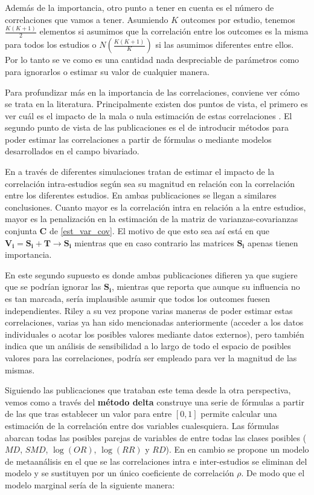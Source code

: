 \documentclass[a4paper,openright,12pt]{report}
\begin{document}
Además de la importancia, otro punto a tener en cuenta es el número de correlaciones que vamos a tener. Asumiendo $K$ outcomes por estudio, tenemos $\frac{K(K+1)}{2}$ elementos si asumimos que la correlación entre los outcomes es la misma para todos los estudios o $N(\frac{K(K+1)}{K})$ si las asumimos diferentes entre ellos. Por lo tanto se ve como es una cantidad nada despreciable de parámetros como para ignorarlos o estimar su valor de cualquier manera.

Para profundizar más en la importancia de las correlaciones, conviene ver cómo se trata en la literatura. Principalmente existen dos puntos de vista, el primero es ver cuál es el impacto de la mala o nula estimación de estas correlaciones \cite{Ishak2008}\cite{Riley2009}. El segundo punto de vista de las publicaciones es el de introducir métodos para poder estimar las correlaciones a partir de fórmulas \cite{Wei2013} o mediante modelos \cite{Riley2007_2}\cite{Riley2008} desarrollados en el campo bivariado.

En \cite{Ishak2008}\cite{Riley2009} a través de diferentes simulaciones tratan de estimar el impacto de la correlación intra-estudios según sea su magnitud en relación con la correlación entre los diferentes estudios. En ambas publicaciones se llegan a similares conclusiones. Cuanto mayor es la correlación intra en relación a la entre estudios, mayor es la penalización en la estimación de la matriz de varianzas-covarianzas conjunta $\mathbf{C}$ de \ref{est_var_cov}. El motivo de que esto sea así está en que $\mathbf{V_{i}} = \mathbf{S_{i}}+\mathbf{T} \longrightarrow \mathbf{S_{i}}$ mientras que en caso contrario las matrices $\mathbf{S_{i}}$ apenas tienen importancia.

En este segundo supuesto es donde ambas publicaciones difieren ya que \cite{Ishak2008} sugiere que se podrían ignorar las $\mathbf{S_{i}}$, mientras que \cite{Riley2009} reporta que aunque su influencia no es tan marcada, sería implausible asumir que todos los outcomes fuesen independientes. Riley a su vez propone varias maneras de poder estimar estas correlaciones, varias ya han sido mencionadas anteriormente (acceder a los datos individuales o acotar los posibles valores mediante datos externos), pero también indica que un análisis de sensibilidad a lo largo de todo el espacio de posibles valores para las correlaciones, podría ser empleado para ver la magnitud de las mismas.  

Siguiendo las publicaciones que trataban este tema desde la otra perspectiva, vemos como \cite{Wei2013} a través del \textbf{método delta} \cite{Cox2005} construye una serie de fórmulas a partir de las que tras establecer un valor para \rho entre $\left[0,1\right]$ permite calcular una estimación de la correlación entre dos variables cualesquiera. Las fórmulas abarcan todas las posibles parejas de variables de entre todas las clases posibles ($MD$, $SMD$, $\log(OR)$, $\log(RR)$ y $RD$). En \cite{Riley2009} en cambio se propone un modelo de metaanálisis en el que se las correlaciones intra e inter-estudios se eliminan del modelo y se sustituyen por un único coeficiente de correlación $\rho$. De modo que el modelo marginal sería de la siguiente manera:
\end{document}
